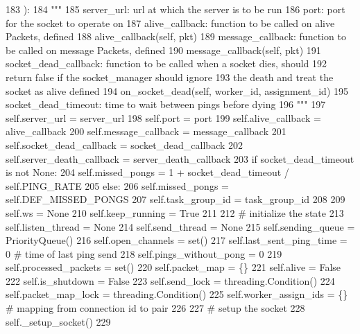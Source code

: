 \begin{DoxyCode}
183     ):
184         \textcolor{stringliteral}{"""}
185 \textcolor{stringliteral}{        server\_url:           url at which the server is to be run}
186 \textcolor{stringliteral}{        port:                 port for the socket to operate on}
187 \textcolor{stringliteral}{        alive\_callback:       function to be called on alive Packets, defined}
188 \textcolor{stringliteral}{                               alive\_callback(self, pkt)}
189 \textcolor{stringliteral}{        message\_callback:     function to be called on message Packets, defined}
190 \textcolor{stringliteral}{                               message\_callback(self, pkt)}
191 \textcolor{stringliteral}{        socket\_dead\_callback: function to be called when a socket dies, should}
192 \textcolor{stringliteral}{                              return false if the socket\_manager should ignore}
193 \textcolor{stringliteral}{                              the death and treat the socket as alive defined}
194 \textcolor{stringliteral}{                               on\_socket\_dead(self, worker\_id, assignment\_id)}
195 \textcolor{stringliteral}{        socket\_dead\_timeout:  time to wait between pings before dying}
196 \textcolor{stringliteral}{        """}
197         self.server\_url = server\_url
198         self.port = port
199         self.alive\_callback = alive\_callback
200         self.message\_callback = message\_callback
201         self.socket\_dead\_callback = socket\_dead\_callback
202         self.server\_death\_callback = server\_death\_callback
203         \textcolor{keywordflow}{if} socket\_dead\_timeout \textcolor{keywordflow}{is} \textcolor{keywordflow}{not} \textcolor{keywordtype}{None}:
204             self.missed\_pongs = 1 + socket\_dead\_timeout / self.PING\_RATE
205         \textcolor{keywordflow}{else}:
206             self.missed\_pongs = self.DEF\_MISSED\_PONGS
207         self.task\_group\_id = task\_group\_id
208 
209         self.ws = \textcolor{keywordtype}{None}
210         self.keep\_running = \textcolor{keyword}{True}
211 
212         \textcolor{comment}{# initialize the state}
213         self.listen\_thread = \textcolor{keywordtype}{None}
214         self.send\_thread = \textcolor{keywordtype}{None}
215         self.sending\_queue = PriorityQueue()
216         self.open\_channels = set()
217         self.last\_sent\_ping\_time = 0  \textcolor{comment}{# time of last ping send}
218         self.pings\_without\_pong = 0
219         self.processed\_packets = set()
220         self.packet\_map = \{\}
221         self.alive = \textcolor{keyword}{False}
222         self.is\_shutdown = \textcolor{keyword}{False}
223         self.send\_lock = threading.Condition()
224         self.packet\_map\_lock = threading.Condition()
225         self.worker\_assign\_ids = \{\}  \textcolor{comment}{# mapping from connection id to pair}
226 
227         \textcolor{comment}{# setup the socket}
228         self.\_setup\_socket()
229 
\end{DoxyCode}


